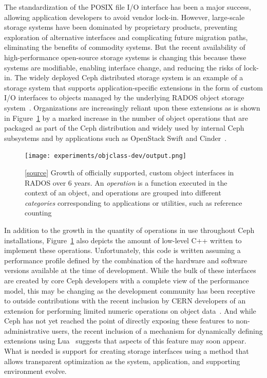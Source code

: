 \documentclass[10pt,twocolumn]{article}
\begin{document}
The standardization of the POSIX file I/O interface has been a major success,
allowing application developers to avoid vendor lock-in. However, large-scale
storage systems have been dominated by proprietary products, preventing
exploration of alternative interfaces and complicating future migration paths,
eliminating the benefits of commodity systems. But the recent availability of
high-performance open-source storage systems is changing this because these
systems are modifiable, enabling interface change, and reducing the risks of
lock-in. The widely deployed Ceph distributed storage system is an example of
a storage system that supports application-specific extensions in the form of
custom I/O interfaces to objects managed by the underlying RADOS object
storage system~\cite{weil:osdi06,weil:pdsw07}. Organizations are increasingly
reliant upon these extensions as is shown in Figure~\ref{fig:objclass-dev} by
a marked increase in the number of object operations that are packaged as part
of the Ceph distribution and widely used by internal Ceph subsystems and by
applications such as OpenStack Swift and Cinder~\cite{openstack}.

\begin{figure}[t]
  \centering
    \texttt{[image: experiments/objclass-dev/output.png]}
    \caption{
[\href{https://github.com/noahdesu/zlog-popper/tree/master/experiments/objclass-dev/visualize.ipynb}{source}]
Growth of officially supported, custom object interfaces in RADOS over 6
years. An \emph{operation} is a function executed in the context of an object,
and operations are grouped into different \emph{categories}
corresponding to applications or utilities, such as reference counting}
\label{fig:objclass-dev}
\end{figure}

In addition to the growth in the quantity of operations in use throughout Ceph
installations, Figure~\ref{fig:objclass-dev} also depicts the amount of
low-level C++ written to implement these operations. Unfortunately, this code
is written assuming a performance profile defined by the combination of the
hardware and software versions available at the time of development.  While
the bulk of these interfaces are created by core Ceph developers with a
complete view of the performance model, this may be changing as the
development community has been receptive to outside contributions with the
recent inclusion by CERN developers of an extension for performing limited
numeric operations on object data~\cite{cls_numops}. And while Ceph has not
yet reached the point of directly exposing these features to
non-administrative users, the recent inclusion of a mechanism for dynamically
defining extensions using Lua~\cite{cls_lua} suggests that aspects of this
feature may soon appear. What is needed is support for creating storage
interfaces using a method that allows transparent optimization as the system,
application, and supporting environment evolve.
\end{document}

